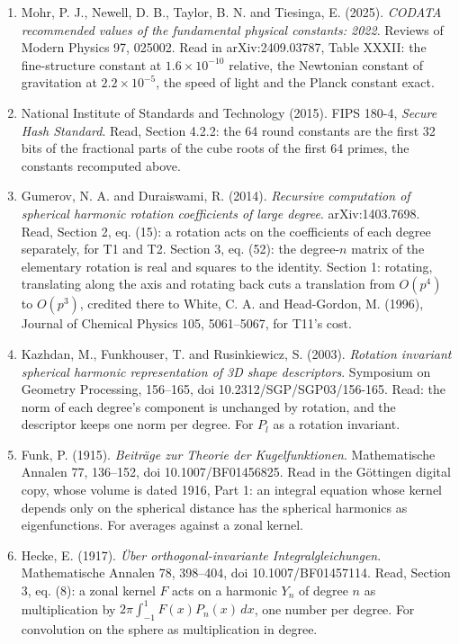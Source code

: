 \begin{enumerate}
  \item Mohr, P. J., Newell, D. B., Taylor, B. N. and Tiesinga, E. (2025). \emph{CODATA recommended values of the fundamental physical constants: 2022}. Reviews of Modern Physics 97, 025002. Read in arXiv:2409.03787, Table XXXII: the fine-structure constant at \(1.6 \times 10^{-10}\) relative, the Newtonian constant of gravitation at \(2.2 \times 10^{-5}\), the speed of light and the Planck constant exact.
  \item National Institute of Standards and Technology (2015). FIPS 180-4, \emph{Secure Hash Standard}. Read, Section 4.2.2: the 64 round constants are the first 32 bits of the fractional parts of the cube roots of the first 64 primes, the constants recomputed above.
  \item Gumerov, N. A. and Duraiswami, R. (2014). \emph{Recursive computation of spherical harmonic rotation coefficients of large degree}. arXiv:1403.7698. Read, Section 2, eq. (15): a rotation acts on the coefficients of each degree separately, for T1 and T2. Section 3, eq. (52): the degree-\(n\) matrix of the elementary rotation is real and squares to the identity. Section 1: rotating, translating along the axis and rotating back cuts a translation from \(O(p^4)\) to \(O(p^3)\), credited there to White, C. A. and Head-Gordon, M. (1996), Journal of Chemical Physics 105, 5061--5067, for T11's cost.
  \item Kazhdan, M., Funkhouser, T. and Rusinkiewicz, S. (2003). \emph{Rotation invariant spherical harmonic representation of 3D shape descriptors}. Symposium on Geometry Processing, 156--165, doi 10.2312/SGP/SGP03/156-165. Read: the norm of each degree's component is unchanged by rotation, and the descriptor keeps one norm per degree. For \(P_l\) as a rotation invariant.
  \item Funk, P. (1915). \emph{Beitr\"age zur Theorie der Kugelfunktionen}. Mathematische Annalen 77, 136--152, doi 10.1007/BF01456825. Read in the G\"ottingen digital copy, whose volume is dated 1916, Part 1: an integral equation whose kernel depends only on the spherical distance has the spherical harmonics as eigenfunctions. For averages against a zonal kernel.
  \item Hecke, E. (1917). \emph{\"Uber orthogonal-invariante Integralgleichungen}. Mathematische Annalen 78, 398--404, doi 10.1007/BF01457114. Read, Section 3, eq. (8): a zonal kernel \(F\) acts on a harmonic \(Y_n\) of degree \(n\) as multiplication by \(2\pi \int_{-1}^{1} F(x) P_n(x)\,dx\), one number per degree. For convolution on the sphere as multiplication in degree.

\end{enumerate}
